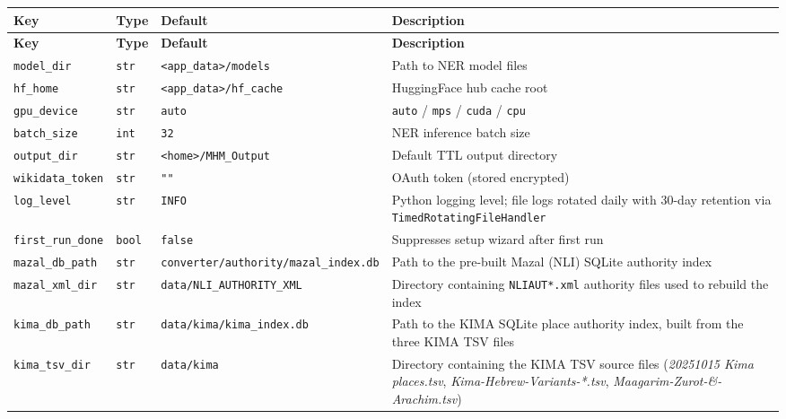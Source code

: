 \documentclass[12pt]{article}
\newcommand{\code}[1]{\texttt{#1}}
\begin{document}
\begin{longtable}{|l|l|p{2.5cm}|p{4cm}|}
\hline
\textbf{Key} & \textbf{Type} & \textbf{Default} & \textbf{Description} \\
\hline
\endfirsthead
\hline
\textbf{Key} & \textbf{Type} & \textbf{Default} & \textbf{Description} \\
\hline
\endhead
\hline
\endfoot
\code{model\_dir} & \code{str} & \code{<app\_data>/models} & Path to NER model files \\
\hline
\code{hf\_home} & \code{str} & \code{<app\_data>/hf\_cache} & HuggingFace hub cache root \\
\hline
\code{gpu\_device} & \code{str} & \code{auto} & \code{auto} / \code{mps} / \code{cuda} / \code{cpu} \\
\hline
\code{batch\_size} & \code{int} & \code{32} & NER inference batch size \\
\hline
\code{output\_dir} & \code{str} & \code{<home>/MHM\_Output} & Default TTL output directory \\
\hline
\code{wikidata\_token} & \code{str} & \code{""} & OAuth token (stored encrypted) \\
\hline
\code{log\_level} & \code{str} & \code{INFO} & Python logging level; file logs rotated daily with 30-day retention via \code{TimedRotatingFileHandler} \\
\hline
\code{first\_run\_done} & \code{bool} & \code{false} & Suppresses setup wizard after first run \\
\hline
\code{mazal\_db\_path} & \code{str} & \code{converter/authority/mazal\_index.db} & Path to the pre-built Mazal (NLI) SQLite authority index \\
\hline
\code{mazal\_xml\_dir} & \code{str} & \code{data/NLI\_AUTHORITY\_XML} & Directory containing \code{NLIAUT*.xml} authority files used to rebuild the index \\
\hline
\code{kima\_db\_path} & \code{str} & \code{data/kima/kima\_index.db} & Path to the KIMA SQLite place authority index, built from the three KIMA TSV files \\
\hline
\code{kima\_tsv\_dir} & \code{str} & \code{data/kima} & Directory containing the KIMA TSV source files (\emph{20251015 Kima places.tsv}, \emph{Kima-Hebrew-Variants-*.tsv}, \emph{Maagarim-Zurot-\&-Arachim.tsv}) \\
\hline
\end{longtable}


\end{document}
